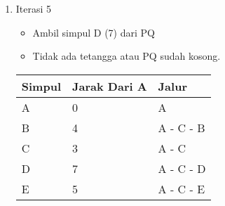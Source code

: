 \begin{enumerate}
    \item Iterasi 5
    \begin{itemize}
        \item Ambil simpul D (7) dari PQ
        \item Tidak ada tetangga atau PQ sudah kosong.
    \end{itemize}
    \begin{table}[h]
        \begin{tabular}{|l|l|l|}
        \hline
            \textbf{Simpul} & \textbf{Jarak Dari A} & \textbf{Jalur} \\ \hline
            A               & 0                     & A     \\ \hline
            B               & 4                     & A - C - B     \\ \hline
            C               & 3                     & A - C     \\ \hline
            D               & 7                     & A - C - D     \\ \hline
            E               & 5                     & A - C - E     \\ \hline
        \end{tabular}
    \end{table}
\end{enumerate}
\newpage
